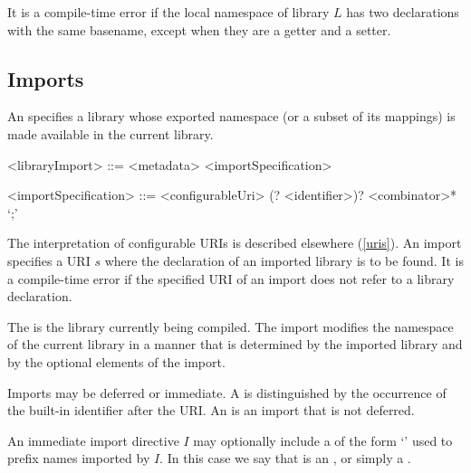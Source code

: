 \documentclass[makeidx]{article}
\begin{document}
{\LMHash{}%
It is a compile-time error if the local namespace of library $L$
has two declarations with the same basename,
except when they are a getter and a setter.



\subsection{Imports}

\LMHash{}%
An  specifies a library whose exported namespace
(or a subset of its mappings) is made available in the current library.

\begin{grammar}
<libraryImport> ::= <metadata> <importSpecification>

<importSpecification> ::= \gnewline{}
  \IMPORT{} <configurableUri> (\DEFERRED? \AS{} <identifier>)? <combinator>* `;'
\end{grammar}

\LMHash{}%
The interpretation of configurable URIs is described elsewhere
(\ref{uris}).
An import specifies a URI $s$
where the declaration of an imported library is to be found.
It is a compile-time error if the specified URI of an import
does not refer to a library declaration.

\LMHash{}%
The  is the library currently being compiled.
The import modifies the namespace of the current library
in a manner that is determined by the imported library and
by the optional elements of the import.

\LMHash{}%
Imports may be deferred or immediate.
A
is distinguished by the occurrence of
the built-in identifier \DEFERRED{} after the URI.
An
is an import that is not deferred.

\LMHash{}%
An immediate import directive $I$ may optionally include
a  of the form `\code{\AS\,\,\id}' used to prefix
names imported by $I$.
In this case we say that \id{} is an ,
or simply a .


}
\end{document}
